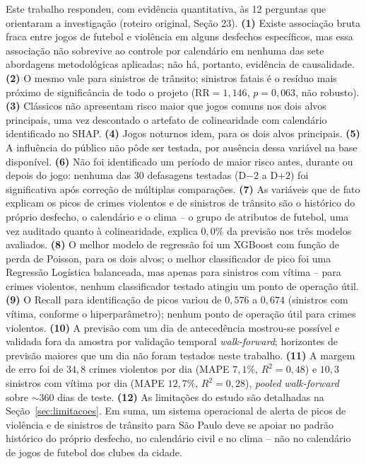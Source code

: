 \documentclass[12pt]{article}
\begin{document}
Este trabalho respondeu, com evidência quantitativa, às 12 perguntas que
orientaram a investigação (roteiro original, Seção 23). \textbf{(1)}
Existe associação bruta fraca entre jogos de futebol e violência em
alguns desfechos específicos, mas essa associação não sobrevive ao
controle por calendário em nenhuma das sete abordagens metodológicas
aplicadas; não há, portanto, evidência de causalidade. \textbf{(2)} O
mesmo vale para sinistros de trânsito; sinistros fatais é o resíduo mais
próximo de significância de todo o projeto (RR$=1,146$, $p=0,063$, não
robusto). \textbf{(3)} Clássicos não apresentam risco maior que jogos
comuns nos dois alvos principais, uma vez descontado o artefato de
colinearidade com calendário identificado no SHAP. \textbf{(4)} Jogos
noturnos idem, para os dois alvos principais. \textbf{(5)} A influência
do público não pôde ser testada, por ausência dessa variável na base
disponível. \textbf{(6)} Não foi identificado um período de maior risco
antes, durante ou depois do jogo: nenhuma das 30 defasagens testadas
(D$-2$ a D$+2$) foi significativa após correção de múltiplas comparações.
\textbf{(7)} As variáveis que de fato explicam os picos de crimes
violentos e de sinistros de trânsito são o histórico do próprio
desfecho, o calendário e o clima -- o grupo de atributos de futebol,
uma vez auditado quanto à colinearidade, explica $0,0\%$ da previsão nos
três modelos avaliados. \textbf{(8)} O melhor modelo de regressão foi um
XGBoost com função de perda de Poisson, para os dois alvos; o melhor
classificador de pico foi uma Regressão Logística balanceada, mas apenas
para sinistros com vítima -- para crimes violentos, nenhum classificador
testado atingiu um ponto de operação útil. \textbf{(9)} O Recall para
identificação de picos variou de $0,576$ a $0,674$ (sinistros com
vítima, conforme o hiperparâmetro); nenhum ponto de operação útil para
crimes violentos. \textbf{(10)} A previsão com um dia de antecedência
mostrou-se possível e validada fora da amostra por validação temporal
\emph{walk-forward}; horizontes de previsão maiores que um dia não foram
testados neste trabalho. \textbf{(11)} A margem de erro foi de $34,8$
crimes violentos por dia (MAPE $7,1\%$, $R^2=0,48$) e $10,3$ sinistros
com vítima por dia (MAPE $12,7\%$, $R^2=0,28$), \emph{pooled}
\emph{walk-forward} sobre $\sim$360 dias de teste. \textbf{(12)} As
limitações do estudo são detalhadas na Seção~\ref{sec:limitacoes}. Em
suma, um sistema operacional de alerta de picos de violência e de
sinistros de trânsito para São Paulo deve se apoiar no padrão histórico
do próprio desfecho, no calendário civil e no clima -- não no calendário
de jogos de futebol dos clubes da cidade.
\end{document}
